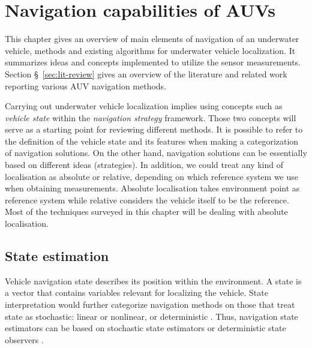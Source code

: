 \chapter{Navigation capabilities of AUVs} \label{chap:capabilities}
This chapter gives an overview of main elements of navigation of an underwater vehicle, methods and existing algorithms for underwater vehicle localization. It summarizes ideas and concepts implemented to utilize the sensor measurements. Section \S~\ref{sec:lit-review}  gives an overview of the literature and related work reporting various AUV navigation methods. 

Carrying out underwater vehicle localization implies using concepts such as \textit{vehicle state} within the \textit{navigation strategy} framework. Those two concepts will serve as a starting point for reviewing different methods. It is possible to refer to the definition of the vehicle state and its features when making a categorization of navigation solutions. On the other hand, navigation solutions can be essentially based on different ideas (strategies). In addition, we could treat any kind of localisation as absolute or relative, depending on which reference system we use when obtaining measurements. Absolute localisation takes environment point as reference system while relative considers the vehicle itself to be the reference. Most of the techniques surveyed in this chapter will be dealing with absolute localisation. 
\section{State estimation}
Vehicle navigation state describes its position within the environment. A state is a vector that contains variables relevant for localizing the vehicle. State interpretation would further categorize navigation methods on those that treat state as stochastic: linear or nonlinear, or deterministic \cite{kinsey06}. Thus, navigation state estimators can be based on stochastic state estimators or deterministic state observers \cite{kinsey06}.

